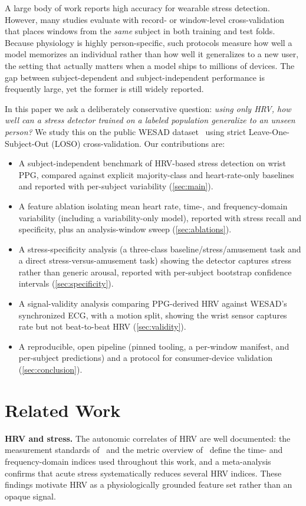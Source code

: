 \documentclass[conference]{IEEEtran}
\begin{document}
A large body of work reports high accuracy for wearable stress detection. However,
many studies evaluate with record- or window-level cross-validation that places
windows from the \emph{same} subject in both training and test folds. Because
physiology is highly person-specific, such protocols measure how well a model
memorizes an individual rather than how well it generalizes to a new user, the
setting that actually matters when a model ships to millions of devices. The gap
between subject-dependent and subject-independent performance is frequently large,
yet the former is still widely reported.

In this paper we ask a deliberately conservative question: \emph{using only HRV,
how well can a stress detector trained on a labeled population generalize to an
unseen person?} We study this on the public WESAD dataset~\cite{schmidt2018wesad}
using strict Leave-One-Subject-Out (LOSO) cross-validation. Our contributions are:
\begin{itemize}
  \item A subject-independent benchmark of HRV-based stress detection on wrist PPG,
        compared against explicit majority-class and heart-rate-only baselines and
        reported with per-subject variability (\cref{sec:main}).
  \item A feature ablation isolating mean heart rate, time-, and frequency-domain
        variability (including a variability-only model), reported with stress recall
        and specificity, plus an analysis-window sweep (\cref{sec:ablations}).
  \item A stress-specificity analysis (a three-class baseline/stress/amusement task and a
        direct stress-versus-amusement task) showing the detector captures stress rather
        than generic arousal, reported with per-subject bootstrap confidence intervals
        (\cref{sec:specificity}).
  \item A signal-validity analysis comparing PPG-derived HRV against WESAD's
        synchronized ECG, with a motion split, showing the wrist sensor captures rate
        but not beat-to-beat HRV (\cref{sec:validity}).
  \item A reproducible, open pipeline (pinned tooling, a per-window manifest, and
        per-subject predictions) and a protocol for consumer-device validation
        (\cref{sec:conclusion}).
\end{itemize}

\section{Related Work}
\label{sec:related_work}
\textbf{HRV and stress.} The autonomic correlates of HRV are well documented: the
measurement standards of~\cite{taskforce1996hrv} and the metric overview
of~\cite{shaffer2017hrv} define the time- and frequency-domain indices used
throughout this work, and a meta-analysis~\cite{kim2018hrv} confirms that acute
stress systematically reduces several HRV indices. These findings motivate HRV as
a physiologically grounded feature set rather than an opaque signal.
\end{document}
